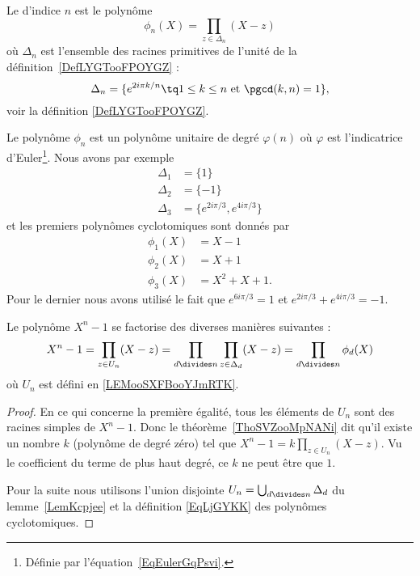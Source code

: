 \begin{definition}  \label{DefXGHooRAXlpp}
	Le  d'indice \( n\) est le polynôme
	\begin{equation}    \label{EqLjGYKK}
		\phi_n(X)=\prod_{z\in\Delta_n}(X-z)
	\end{equation}
	où \( \Delta_n\) est l'ensemble des racines primitives de l'unité de la définition~\ref{DefLYGTooFPOYGZ} :
	\begin{equation}
		\Delta_n=\{  e^{2i\pi k/n}\tq 1\leq k\leq n \text{ et } \pgcd(k,n)=1 \},
	\end{equation}
    voir la définition \ref{DefLYGTooFPOYGZ}.
\end{definition}

Le polynôme \( \phi_n\) est un polynôme unitaire de degré \( \varphi(n)\) où \( \varphi\) est l'indicatrice d'Euler\footnote{Définie par l'équation~\ref{EqEulerGqPsvi}.}. Nous avons par exemple
\begin{subequations}
	\begin{align}
		\Delta_1 & =\{  1 \}                          \\
		\Delta_2 & =\{ -1 \}                          \\
		\Delta_3 & =\{  e^{2i\pi /3}, e^{4i\pi /3} \}
	\end{align}
\end{subequations}
et les premiers polynômes cyclotomiques sont donnés par
\begin{subequations}
	\begin{align}
		\phi_1(X) & =X-1      \\
		\phi_2(X) & =X+1      \\
		\phi_3(X) & =X^2+X+1.
	\end{align}
\end{subequations}
Pour le dernier nous avons utilisé le fait que \( e^{6i\pi /3}=1\) et \( e^{2i\pi /3} + e^{4i\pi /3}=-1\).

\begin{lemma}   \label{LemKYGBooAwpOHD}
	Le polynôme \( X^n-1\) se factorise des diverses manières suivantes :
	\begin{equation}
		X^n-1=\prod_{z\in U_n}(X-z)=\prod_{d\divides n}\prod_{z\in \Delta_d}(X-z)=\prod_{d\divides n}\phi_d(X)
	\end{equation}
	où \( U_n\) est défini en \ref{LEMooSXFBooYJmRTK}.
\end{lemma}

\begin{proof}
	En ce qui concerne la première égalité, tous les éléments de \( U_n\) sont des racines simples de \( X^n-1\). Donc le théorème~\ref{ThoSVZooMpNANi} dit qu'il existe un nombre \( k\) (polynôme de degré zéro) tel que \( X^n-1=k\prod_{z\in U_n}(X-z)\). Vu le coefficient du terme de plus haut degré, ce \( k\) ne peut être que \( 1\).

	Pour la suite nous utilisons l'union disjointe \( U_n=\bigcup_{d\divides n}\Delta_d\) du lemme~\ref{LemKcpjee} et la définition \eqref{EqLjGYKK} des polynômes cyclotomiques.
\end{proof}

